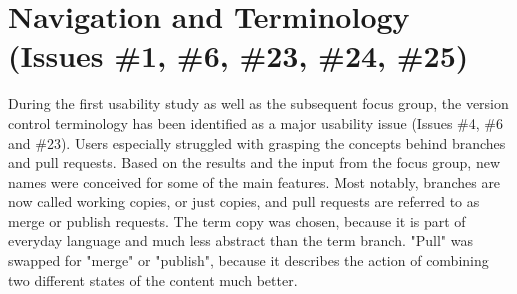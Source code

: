 
\section{Navigation and Terminology (Issues \#1, \#6, \#23, \#24, \#25)} \label{sec:navigation-revised-terminology}
During the first usability study as well as the subsequent focus group, the version control terminology has been identified as a major usability issue (Issues \#4, \#6 and \#23). Users especially struggled with grasping the concepts behind branches and pull requests. Based on the results and the input from the focus group, new names were conceived for some of the main features. Most notably, branches are now called working copies, or just copies, and pull requests are referred to as merge or publish requests. The term copy was chosen, because it is part of everyday language and much less abstract than the term branch. "Pull" was swapped for "merge" or "publish", because it describes the action of combining two different states of the content much better.

